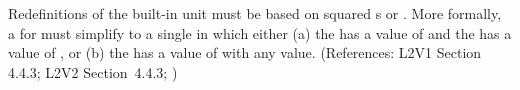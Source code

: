 Redefinitions of the built-in unit  must be based on squared
s or .  More formally, a \UnitDefinition
for  must simplify to a single \Unit in which either (a) the
  has a value of  and the
  has a value of , or (b) the
  has a value of  with
any  value.  (References: L2V1 Section 4.4.3; L2V2
Section~4.4.3; )

